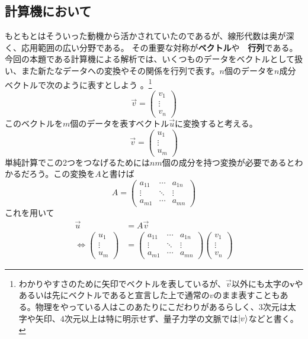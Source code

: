 \documentclass[10pt]{jsarticle}
\newcommand{\vc}[1]{\overrightarrow{#1}}%
\newcommand{\vct}[1]{\bm{#1}}%
\numberwithin{equation}{section}%
\begin{document}
\subsection{計算機において}
もともとはそういった動機から活かされていたのであるが、線形代数は奥が深く、応用範囲の広い分野である。
その重要な対称が{\bf ベクトル}や{\bf　行列}である。
今回の本題である計算機による解析では、いくつものデータをベクトルとして扱い、また新たなデータへの変換やその関係を行列で表す。$n$個のデータを$n$成分ベクトルで次のように表すとしよう
。\footnote{わかりやすさのために矢印でベクトルを表しているが、$\vc{v}$以外にも太字の$\vct{v}$やあるいは先にベクトルであると宣言した上で通常の$v$のまま表すこともある。物理をやっている人はこのあたりにこだわりがあるらしく、3次元は太字や矢印、4次元以上は特に明示せず、量子力学の文脈では$\ket{v}$などと書く。}
\begin{equation}
  \vc{v}=\left( \begin{matrix}
    v_{1}\\
    \vdots \\
    v_{n}
  \end{matrix} \right)
\end{equation}
このベクトルを$m$個のデータを表すベクトル$\vc{u}$に変換すると考える。
\begin{equation}
  \vc{v}=\left( \begin{matrix}
    u_{1}\\
    \vdots \\
    u_{m}
  \end{matrix} \right)
\end{equation}
単純計算でこの2つをつなげるためには$nm$個の成分を持つ変換が必要であるとわかるだろう。この変換を$A$と書けば
\begin{equation}
  A=\left( \begin{matrix}
    a_{11} & \cdots & a_{1n} \\
    \vdots & \ddots & \vdots \\
    a_{m1} & \cdots & a_{mn}
  \end{matrix} \right)
\end{equation}
これを用いて
\begin{align}
  \vc{u} &= A \vc{v}\\
 \Leftrightarrow  \left( \begin{matrix}
    u_{1}\\
    \vdots \\
    u_{m}
  \end{matrix} \right)&=\left( \begin{matrix}
    a_{11} & \cdots & a_{1n} \\
    \vdots & \ddots & \vdots \\
    a_{m1} & \cdots & a_{mn}
  \end{matrix} \right)\left( \begin{matrix}
    v_{1}\\
    \vdots \\
    v_{n}
  \end{matrix} \right)
\end{align}
\end{document}
